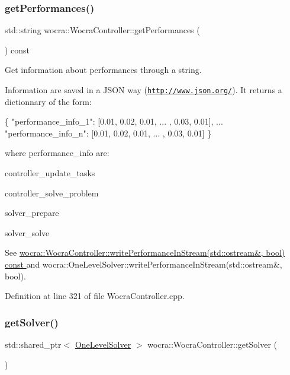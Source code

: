 \subsubsection{\texorpdfstring{get\+Performances()}{getPerformances()}}
{\footnotesize\ttfamily std\+::string wocra\+::\+Wocra\+Controller\+::get\+Performances (\begin{DoxyParamCaption}{ }\end{DoxyParamCaption}) const}

Get information about performances through a string.

Information are saved in a J\+S\+ON way (\href{http://www.json.org/}{\tt http\+://www.\+json.\+org/}). It returns a dictionnary of the form\+:


\begin{DoxyCode}
\{
   \textcolor{stringliteral}{"performance\_info\_1"}: [0.01, 0.02, 0.01, ... , 0.03, 0.01],
   ...
   \textcolor{stringliteral}{"performance\_info\_n"}: [0.01, 0.02, 0.01, ... , 0.03, 0.01]
\}
\end{DoxyCode}


where performance\+\_\+info are\+:


\begin{DoxyItemize}
\item controller\+\_\+update\+\_\+tasks
\item controller\+\_\+solve\+\_\+problem
\item solver\+\_\+prepare
\item solver\+\_\+solve
\end{DoxyItemize}

See \hyperlink{classwocra_1_1WocraController_a9b296a995ba10ef66cc4416f34f4b675}{wocra\+::\+Wocra\+Controller\+::write\+Performance\+In\+Stream(std\+::ostream\&, bool) const }and wocra\+::\+One\+Level\+Solver\+::write\+Performance\+In\+Stream(std\+::ostream\&, bool). 

Definition at line 321 of file Wocra\+Controller.\+cpp.

\hypertarget{classwocra_1_1WocraController_a94f67ee0ae6985969f4f1798bde0a9db}{}\label{classwocra_1_1WocraController_a94f67ee0ae6985969f4f1798bde0a9db} 
\subsubsection{\texorpdfstring{get\+Solver()}{getSolver()}}
{\footnotesize\ttfamily std\+::shared\+\_\+ptr$<$ \hyperlink{classocra_1_1OneLevelSolver}{One\+Level\+Solver} $>$ wocra\+::\+Wocra\+Controller\+::get\+Solver (\begin{DoxyParamCaption}{ }\end{DoxyParamCaption})}

